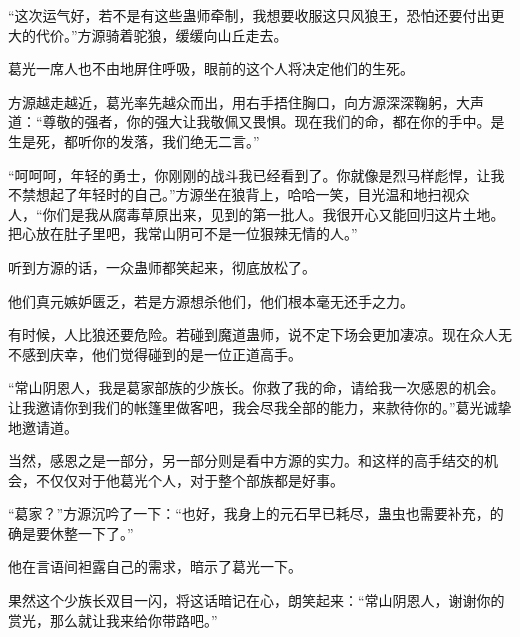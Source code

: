 \begin{this_body}
“这次运气好，若不是有这些蛊师牵制，我想要收服这只风狼王，恐怕还要付出更大的代价。”方源骑着驼狼，缓缓向山丘走去。

葛光一席人也不由地屏住呼吸，眼前的这个人将决定他们的生死。

方源越走越近，葛光率先越众而出，用右手捂住胸口，向方源深深鞠躬，大声道：“尊敬的强者，你的强大让我敬佩又畏惧。现在我们的命，都在你的手中。是生是死，都听你的发落，我们绝无二言。”

“呵呵呵，年轻的勇士，你刚刚的战斗我已经看到了。你就像是烈马样彪悍，让我不禁想起了年轻时的自己。”方源坐在狼背上，哈哈一笑，目光温和地扫视众人，“你们是我从腐毒草原出来，见到的第一批人。我很开心又能回归这片土地。把心放在肚子里吧，我常山阴可不是一位狠辣无情的人。”

听到方源的话，一众蛊师都笑起来，彻底放松了。

他们真元嫉妒匮乏，若是方源想杀他们，他们根本毫无还手之力。

有时候，人比狼还要危险。若碰到魔道蛊师，说不定下场会更加凄凉。现在众人无不感到庆幸，他们觉得碰到的是一位正道高手。

“常山阴恩人，我是葛家部族的少族长。你救了我的命，请给我一次感恩的机会。让我邀请你到我们的帐篷里做客吧，我会尽我全部的能力，来款待你的。”葛光诚挚地邀请道。

当然，感恩之是一部分，另一部分则是看中方源的实力。和这样的高手结交的机会，不仅仅对于他葛光个人，对于整个部族都是好事。

“葛家？”方源沉吟了一下：“也好，我身上的元石早已耗尽，蛊虫也需要补充，的确是要休整一下了。”

他在言语间袒露自己的需求，暗示了葛光一下。

果然这个少族长双目一闪，将这话暗记在心，朗笑起来：“常山阴恩人，谢谢你的赏光，那么就让我来给你带路吧。”

\end{this_body}


